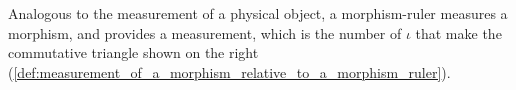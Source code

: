 \noindent
\begin{minipage}{0.6\textwidth}
    Analogous to the measurement of a physical object, a morphism-ruler measures a morphism, and provides a measurement, which is the number of $\iota$ that make the commutative triangle shown on the right (\autoref{def:measurement_of_a_morphism_relative_to_a_morphism_ruler}).
\end{minipage}
\hfill
\begin{minipage}{0.29\textwidth}
    \begin{center}
    \end{center} 
\end{minipage}
\vspace{1mm}

